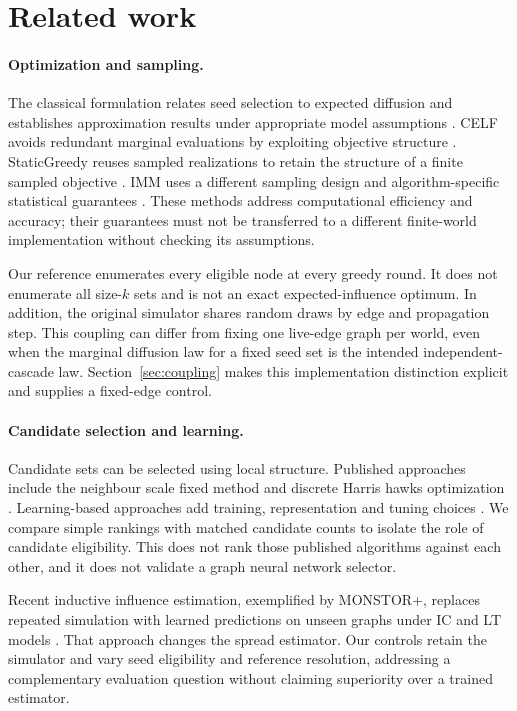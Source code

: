 \documentclass[smallextended]{svjour3}
\begin{document}
\section{Related work}
\paragraph{Optimization and sampling.}
The classical formulation relates seed selection to expected diffusion and establishes approximation results under appropriate model assumptions \cite{ref1}. CELF avoids redundant marginal evaluations by exploiting objective structure \cite{ref7}. StaticGreedy reuses sampled realizations to retain the structure of a finite sampled objective \cite{ref8}. IMM uses a different sampling design and algorithm-specific statistical guarantees \cite{ref2}. These methods address computational efficiency and accuracy; their guarantees must not be transferred to a different finite-world implementation without checking its assumptions.

Our reference enumerates every eligible node at every greedy round. It does not enumerate all size-$k$ sets and is not an exact expected-influence optimum. In addition, the original simulator shares random draws by edge and propagation step. This coupling can differ from fixing one live-edge graph per world, even when the marginal diffusion law for a fixed seed set is the intended independent-cascade law. Section~\ref{sec:coupling} makes this implementation distinction explicit and supplies a fixed-edge control.

\paragraph{Candidate selection and learning.}
Candidate sets can be selected using local structure. Published approaches include the neighbour scale fixed method and discrete Harris hawks optimization \cite{ref12,ref13}. Learning-based approaches add training, representation and tuning choices \cite{ref10,ref14}. We compare simple rankings with matched candidate counts to isolate the role of candidate eligibility. This does not rank those published algorithms against each other, and it does not validate a graph neural network selector.

Recent inductive influence estimation, exemplified by MONSTOR+, replaces repeated simulation with learned predictions on unseen graphs under IC and LT models \cite{ref19}. That approach changes the spread estimator. Our controls retain the simulator and vary seed eligibility and reference resolution, addressing a complementary evaluation question without claiming superiority over a trained estimator.
\end{document}
